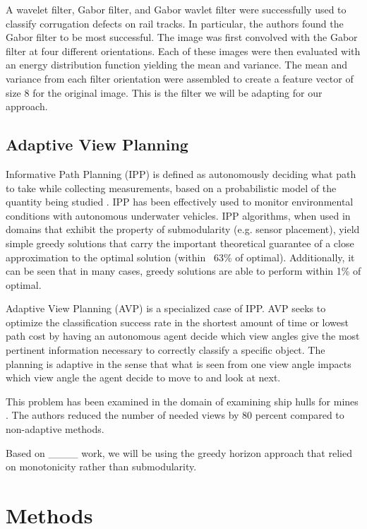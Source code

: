\documentclass[letterpaper, 10 pt, conference]{ieeeconf}  %
\begin{document}
A wavelet filter, Gabor filter, and Gabor wavlet filter were successfully used to classify corrugation defects on rail tracks\cite{railDefect}. In particular, the authors found the Gabor filter to be most successful. The image was first convolved with the Gabor filter at four different orientations. Each of these images were then evaluated with an energy distribution function yielding the mean and variance.  The mean and variance from each filter orientation were assembled to create a feature vector of size 8 for the original image. This is the filter we will be adapting for our approach.

\subsection{Adaptive View Planning}

Informative Path Planning (IPP) is defined as autonomously deciding what path to take while collecting measurements, based on a probabilistic model of the quantity being studied \cite{BNBIPP}. IPP has been effectively used to monitor environmental conditions with autonomous underwater vehicles\cite{BNBIPP}\cite{underwaterIPP}. IPP algorithms, when used in domains that exhibit the property of submodularity (e.g. sensor placement), yield simple greedy solutions that carry the important theoretical guarantee of a close approximation to the optimal solution (within ~63\% of optimal). Additionally, it can be seen that in many cases, greedy solutions are able to perform within 1\% of optimal. 

Adaptive View Planning (AVP) is a specialized case of IPP. AVP seeks to optimize the classification success rate in the shortest amount of time or lowest path cost by having an autonomous agent decide which view angles give the most pertinent information necessary to correctly classify a specific object. The planning is adaptive in the sense that what is seen from one view angle impacts which view angle the agent decide to move to and look at next\cite{hollinger2011active}. 

This problem has been examined in the domain of examining ship hulls for mines \cite{hollinger2011active}. The authors reduced the number of needed views by 80 percent compared to non-adaptive methods.

Based on ____ work, we will be using the greedy horizon approach that relied on monotonicity rather than submodularity.

\section{Methods}
\end{document}
